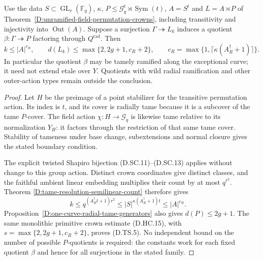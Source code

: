\begin{corollary}
\label{D:tame-field-permutation-crowns}
Use the data $S\subset\operatorname{GL}_r(\mathbb F_q)$,
$\kappa$, $P\leq\mathcal G_q^t\rtimes\operatorname{Sym}(t)$,
$A=S^t$ and $L=A\rtimes P$ of
Theorem~\ref{D:unramified-field-permutation-crowns},
including transitivity and injectivity into
$\operatorname{Out}(A)$. Suppose a surjection
$\Gamma\twoheadrightarrow L_k$ induces a quotient
$\beta:\Gamma\twoheadrightarrow P$ factoring through
$Q^{\mathrm{rad}}$. Then
\[
 k\leq|A|^{c_R},\qquad
 d(L_k)\leq\max\{2,2g+1,c_R+2\},
 \qquad
 c_R=\max\{1,\lceil\kappa(A_R^\dagger+1)\rceil\}.      \tag{D.TS.5}
\]
In particular the quotient $\beta$ may be tamely
ramified along the exceptional curve; it need not
extend etale over $Y$. Quotients with wild radial
ramification and other outer-action types remain
outside the conclusion.
\end{corollary}

\begin{proof}
Let $H$ be the preimage of a point stabilizer for the
transitive permutation action. Its index is $t$,
and its cover is radially tame because it is a
subcover of the tame $P$-cover. The field action
$\chi:H\to\mathcal G_q$ is likewise tame relative
to its normalization $Y_H$: it factors through
the restriction of that same tame cover. Stability
of tameness under base change, subextensions and
normal closure gives the stated boundary condition.

The explicit twisted Shapiro bijection
(D.SC.11)--(D.SC.13) applies without change to this
group action. Distinct crown coordinates give
distinct classes, and the faithful ambient linear
embedding multiplies their count by at most
$q^{r^2}$. Theorem
\ref{D:tame-resolution-semilinear-count} therefore
gives
\[
 k\leq q^{(A_R^\dagger t+1)r^2}
       \leq |S|^{\kappa(A_R^\dagger+1)t}
       \leq |A|^{c_R}.
\]
Proposition~\ref{D:one-curve-radial-tame-generators}
also gives $d(P)\leq2g+1$. The same monolithic
primitive crown estimate (D.HC.15), with
$s=\max\{2,2g+1,c_R+2\}$, proves (D.TS.5).
No independent bound on the number of possible
$P$-quotients is required: the constants work for
each fixed quotient $\beta$ and hence for all
surjections in the stated family.
\end{proof}
